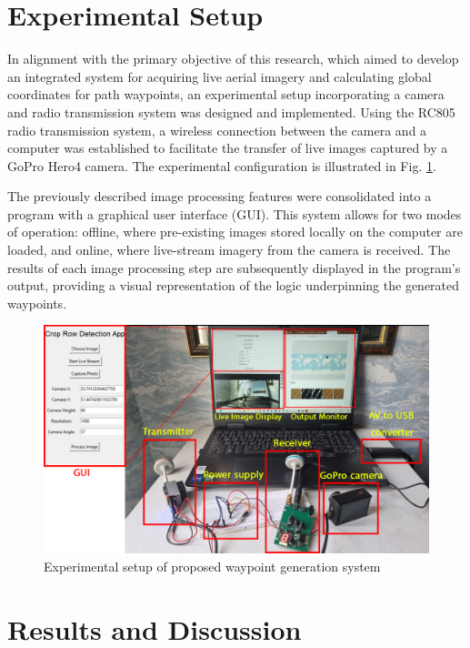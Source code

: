 \documentclass[conference]{IEEEtran}
\begin{document}
	
	\section{Experimental Setup}\label{Experimental Setup}
	In alignment with the primary objective of this research, which aimed to develop an integrated system for acquiring live aerial imagery and calculating global coordinates for path waypoints, an experimental setup incorporating a camera and radio transmission system was designed and implemented. Using the RC805 radio transmission system, a wireless connection between the camera and a computer was established to facilitate the transfer of live images captured by a GoPro Hero4 camera. The experimental configuration is illustrated in Fig.
	\ref{EXP}.
	
	The previously described image processing features were consolidated into a program with a graphical user interface (GUI). This system allows for two modes of operation: offline, where pre-existing images stored locally on the computer are loaded, and online, where live-stream imagery from the camera is received. The results of each image processing step are subsequently displayed in the program's output, providing a visual representation of the logic underpinning the generated waypoints.
	
	
	
	
	\begin{figure}[t]
		\includegraphics[width=\linewidth]{Setup of experiment.png}
		\caption{Experimental setup of proposed waypoint generation system}
		\label{EXP}
	\end{figure}
	
	\section{Results and Discussion}\label{Results and Discussion}
	
\end{document}
